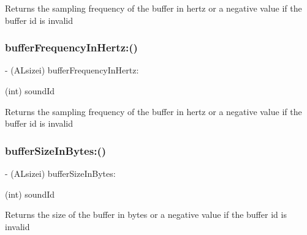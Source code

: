 Returns the sampling frequency of the buffer in hertz or a negative value if the buffer id is invalid \mbox{\label{interfaceCDSoundEngine_af8559b48f34ad22ba9a7cf27ffcb8648}} 
\subsubsection{\texorpdfstring{buffer\+Frequency\+In\+Hertz\+:()}{bufferFrequencyInHertz:()}\hspace{0.1cm}{\footnotesize\ttfamily [4/4]}}
{\footnotesize\ttfamily -\/ (A\+Lsizei) buffer\+Frequency\+In\+Hertz\+: \begin{DoxyParamCaption}\item[{(int)}]{sound\+Id }\end{DoxyParamCaption}}

Returns the sampling frequency of the buffer in hertz or a negative value if the buffer id is invalid \mbox{\label{interfaceCDSoundEngine_a91672bece24f10760d62cce27986573e}} 
\subsubsection{\texorpdfstring{buffer\+Size\+In\+Bytes\+:()}{bufferSizeInBytes:()}\hspace{0.1cm}{\footnotesize\ttfamily [1/4]}}
{\footnotesize\ttfamily -\/ (A\+Lsizei) buffer\+Size\+In\+Bytes\+: \begin{DoxyParamCaption}\item[{(int)}]{sound\+Id }\end{DoxyParamCaption}}

Returns the size of the buffer in bytes or a negative value if the buffer id is invalid \mbox{\label{interfaceCDSoundEngine_a91672bece24f10760d62cce27986573e}} 
